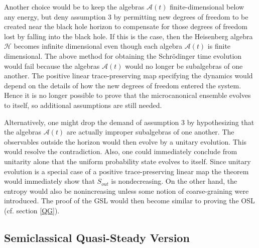 \documentclass{article}
\begin{document}
Another choice would be to keep the algebras $\mathcal{A}(t)$ finite-dimensional below any energy, but deny assumption 3 by permitting new degrees of freedom to be created near the black hole horizon to compensate for those degrees of freedom lost by falling into the black hole.  If this is the case, then the Heisenberg algebra $\mathcal{H}$ becomes infinite dimensional even though each algebra $\mathcal{A}(t)$ is finite dimensional.  The above method for obtaining the Schr\"{o}dinger time evolution would fail because the algebras $\mathcal{A}(t)$ would no longer be subalgebras of one another.  The positive linear trace-preserving map specifying the dynamics would depend on the details of how the new degrees of freedom entered the system.  Hence it is no longer possible to prove that the microcanonical ensemble evolves to itself, so additional assumptions are still needed.

Alternatively, one might drop the demand of assumption 3 by hypothesizing that the algebras $\mathcal{A}(t)$ are actually improper subalgebras of one another.  The observables outside the horizon would then evolve by a unitary evolution.  This would resolve the contradiction.  Also, one could immediately conclude from unitarity alone that the uniform probability state evolves to itself.  Since unitary evolution is a special case of a positive trace-preserving linear map the theorem would immediately show that $S_{out}$ is nondecreasing.  On the other hand, the entropy would also be nonincreasing unless some notion of coarse-graining were introduced.  The proof of the GSL would then become similar to proving the OSL (cf. section \ref{QG}).

\subsection{Semiclassical Quasi-Steady Version}\label{semi}
\end{document}
